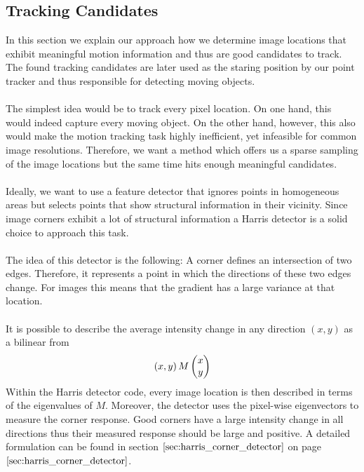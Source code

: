 \subsection{Tracking Candidates}
\label{sec:tracking_candidates}
In this section we explain our approach how we determine image locations that exhibit meaningful motion information and thus are good candidates to track. The found tracking candidates are later used as the staring position by our point tracker and thus responsible for detecting moving objects. \\ \\
The simplest idea would be to track every pixel location. On one hand, this would indeed capture every moving object. On the other hand, however, this also would make the motion tracking task highly inefficient, yet infeasible for common image resolutions. Therefore, we want a method which offers us a sparse sampling of the image locations but the same time hits enough meaningful candidates. \\ \\
Ideally, we want to use a feature detector that ignores points in homogeneous areas but selects points that show structural information in their vicinity. Since image corners exhibit a lot of structural information a Harris detector is a solid choice to approach this task. \\ \\
The idea of this detector is the following: A corner defines an intersection of two edges. Therefore, it represents a point in which the directions of these two edges change. For images this means that the gradient has a large variance at that location. \\ \\
It is possible to describe the average intensity change in any direction $(x,y)$
as a bilinear from
\begin{equation}
\left( x,y \right) M \colvec{x}{y}	
\end{equation}
Within the Harris detector code, every image location is then described in terms of the eigenvalues of $M$. Moreover, the detector uses the pixel-wise eigenvectors to measure the corner response. Good corners have a large intensity change in all directions thus their measured response should be large and positive. A detailed formulation can be found in section $\ref{sec:harris_corner_detector}$ on page $\pageref{sec:harris_corner_detector}$. \\ \\
